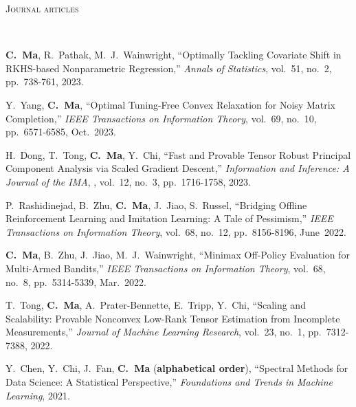 \documentclass[a4paper, 10pt]{article}
\newenvironment{changemargin}[2]{%
  \begin{list}{}{%
    \setlength{\topsep}{0pt}%
    \setlength{\leftmargin}{#1}%
    \setlength{\rightmargin}{#2}%
    \setlength{\listparindent}{\parindent}%
    \setlength{\itemindent}{\parindent}%
    \setlength{\parsep}{\parskip}%
  }%
  \item[]}{\end{list}
}
\newcommand{\lineover}{
	\begin{changemargin}{-0.05in}{-0.05in}
		\vspace*{-8pt}
		\hrulefill \\
		\vspace*{-2pt}
	\end{changemargin}
}
\newcommand{\header}[1]{
	\begin{changemargin}{-0.5in}{-0.5in}
		\scshape{#1}\\
  	\lineover
	\end{changemargin}
}
\newenvironment{body} {
	\vspace*{-16pt}
	\begin{changemargin}{-0.3in}{-0.5in}
  }	
	{\end{changemargin}
}
\begin{document}
\bigskip
\header{\LARGE{Journal articles}}
\begin{body}
\vspace{18pt}
\begin{enumerate}[label={[{J}{{\arabic*}}]}]


\item \textbf{C.~Ma}, R.~Pathak, M.~J.~Wainwright, ``Optimally Tackling Covariate Shift in RKHS-based Nonparametric Regression,'' \emph{Annals of Statistics},  vol.~51, no.~2, pp.~738-761, 2023.

	
\item Y.~Yang, \textbf{C.~Ma}, {``Optimal Tuning-Free Convex Relaxation for Noisy Matrix Completion,''}  \emph{IEEE Transactions on Information Theory}, vol.~69, no.~10, pp.~6571-6585, Oct.~2023. \\

\item {H.~Dong, T.~Tong, \textbf{C.~Ma}, Y.~Chi, ``Fast and Provable Tensor Robust Principal Component Analysis via Scaled Gradient Descent,''} \emph{Information and Inference: A Journal of the IMA}, , vol.~12, no.~3, pp.~1716-1758, 2023.


\item P.~Rashidinejad, B.~Zhu, \textbf{C.~Ma}, J.~Jiao, S.~Russel, {``Bridging Offline Reinforcement Learning and Imitation Learning: A Tale of Pessimism,''} \emph{IEEE Transactions on Information Theory},  vol.~68, no.~12, pp.~8156-8196, June~2022.

\item \textbf{C.~Ma}, B.~Zhu, J.~Jiao, M.~J.~Wainwright, {``Minimax Off-Policy Evaluation for Multi-Armed Bandits,''} \emph{IEEE Transactions on Information Theory}, vol.~68, no.~8, pp.~5314-5339, Mar.~2022. \\


\item T.~Tong, \textbf{C.~Ma}, A.~Prater-Bennette, E.~Tripp, Y.~Chi, {``Scaling and Scalability: Provable Nonconvex Low-Rank Tensor
Estimation from Incomplete Measurements,''} \emph{Journal of Machine Learning Research}, vol.~23, no.~1, pp.~7312-7388, 2022. \\



\item Y.~Chen, Y.~Chi, J.~Fan, \textbf{C.~Ma} (\textbf{alphabetical order}), {``Spectral Methods for Data Science: A Statistical Perspective,''}  \emph{Foundations and Trends in Machine Learning}, 2021. \\


\end{enumerate}
\end{body}
\end{document}
